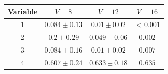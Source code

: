 \label{tab:statistical_testing_results_sim}
    \begin{tabular}{cccc}
        \toprule
        Variable & 
        $V=8$ & 
        $V=12$ & 
        $V=16$\\  
        \midrule
         1  & \(0.084 \pm 0.13\)   & \(0.01 \pm 0.02\)   & \(<0.001\)  
            \\
         2  & \(0.2 \pm 0.29\)   & \(0.049 \pm 0.06\)   & \(0.002\)  
            \\
         3  & \(0.084 \pm 0.16\)   & \(0.01 \pm 0.02\)   & \(0.007\)  
            \\
         4  & \(0.607 \pm 0.24\)   & \(0.633 \pm 0.18\)   & \(0.635\)  
            \\
        \bottomrule
    \end{tabular}